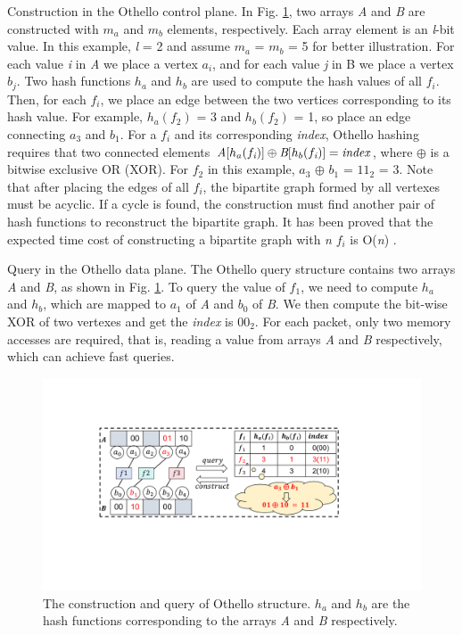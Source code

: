 Construction in the Othello control plane.
In Fig. \ref{4}, two arrays \emph{A} and \emph{B} are constructed with \emph{$m_a$} and \emph{$m_b$} elements, respectively. Each array element is an \emph{l}-bit value. In this example, \emph{l} = 2 and assume \emph{$m_a$} = \emph{$m_b$} = 5 for better illustration. For each value \emph{i} in \emph{A} we place a vertex \emph{$a_i$}, and for each value \emph{j} in B we place a vertex \emph{$b_j$}. Two hash functions \emph{$h_a$} and \emph{$h_b$} are used to compute the hash values of all \emph{$f_i$}. Then, for each \emph{$f_i$}, we place an edge between the two vertices corresponding to its hash value. For example, \emph{$h_a(f_{\text{2}})$} = 3 and \emph{$h_b(f_{\text{2}})$} = 1, so place an edge connecting \emph{$a_3$} and \emph{$b_1$}. For a \emph{$f_i$} and its corresponding \emph{index}, Othello hashing requires that two connected elements $\emph{A}[\emph{$h_a(f_{\text{i}})$}] \oplus \emph{B}[\emph{$h_b(f_{\text{i}})$}] = \emph{index}$, where $\oplus$ is a bitwise exclusive OR (XOR). For \emph{$f_2$} in this example, \emph{$a_3$} $\oplus$ \emph{$b_1$} = $11_2$ = 3. Note that after placing the edges of all \emph{$f_i$}, the bipartite graph formed by all vertexes must be acyclic. If a cycle is found, the construction must find another pair of hash functions to reconstruct the bipartite graph. It has been proved that the expected time cost of constructing a bipartite graph with \emph{n} \emph{$f_i$} is O(\emph{n}) \cite{yu2018memory}.

Query in the Othello data plane.
The Othello query structure contains two arrays \emph{A} and \emph{B}, as shown in Fig. \ref{4}. To query the value of \emph{\emph{$f_{\text{1}}$}}, we need to compute \emph{$h_a$} and \emph{$h_b$}, which are mapped to \emph{$a_1$} of \emph{A} and \emph{$b_0$} of \emph{B}. We then compute the bit-wise XOR of two vertexes and get the \emph{index} is $00_2$. For each packet, only two memory accesses are required, that is, reading a value from arrays \emph{A} and \emph{B} respectively, which can achieve fast queries.

\begin{figure}[t]
	\setlength{\abovecaptionskip}{0pt}
	\setlength{\belowcaptionskip}{-10pt}
	\centering
	\includegraphics[width=1\linewidth]{figure/othello.pdf}
	\caption{The construction and query of Othello structure. \emph{$h_a$} and \emph{$h_b$} are the hash functions corresponding to the arrays \emph{A} and \emph{B} respectively.}
	\label{4}
\end{figure}